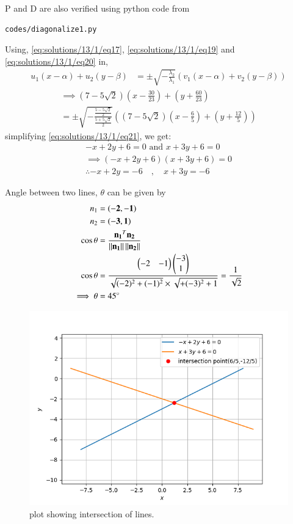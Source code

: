 P and D are also verified using python code from
\begin{lstlisting}
codes/diagonalize1.py
\end{lstlisting}
Using, \eqref{eq:solutions/13/1/eq17}, \eqref{eq:solutions/13/1/eq19} and \eqref{eq:solutions/13/1/eq20} in,
\begin{align}
	u_1(x-\alpha) + u_2(y-\beta) &= \pm \sqrt{-\frac{\lambda_2}{\lambda_1}}(v_1(x-\alpha) + v_2(y-\beta))\label{eq:solutions/13/1/eq14}
\end{align}
\begin{multline}\label{eq:solutions/13/1/eq21}
\implies	\left(7-5 \sqrt{2}\right)\left(x-\frac{30}{23}\right) + \left(y+\frac{60}{23}\right) \\= \pm \sqrt{-\frac{\frac{5-5\sqrt{2}}{2}}{\frac{5+5\sqrt{2}}{2}}}\left(\left(7-5 \sqrt{2}\right)\left(x-\frac{6}{5}\right) + \left(y+\frac{12}{5}\right)\right)
\end{multline}
simplifying \ref{eq:solutions/13/1/eq21}, we get:
\begin{align}
	\label{eq:solutions/13/1/eq22}-x + 2y + 6 = 0 \text{ and } x + 3y + 6 = 0\\
	\implies (-x + 2y + 6)(x + 3y + 6) = 0\\
	\therefore -x+2y=-6 \quad , \quad x+3y=-6\label{eq:solutions/13/1/eq23}
\end{align}


Angle between two lines, $\theta$ can be given by
\begin{align}
n_1&=(\mathbf{-2,-1})\\
n_2&=(\mathbf{-3,1})\\
\cos \theta &= \frac{\mathbf{n_1}^T\mathbf{n_2}}{\left\lVert\mathbf{n_1}\right\rVert\left\lVert\mathbf{n_2}\right\rVert}\\
\cos \theta&=\frac{\begin{pmatrix}-2&-1\end{pmatrix}\begin{pmatrix}-3\\1\end{pmatrix}}{\sqrt{(-2)^2 +(-1)^2} \times \sqrt{+(-3)^2+1}}=\frac{1}{\sqrt{2}}\\
\implies \theta &= 45\degree
\end{align}
\begin{figure}[!h]
\centering
\includegraphics[width=\columnwidth]{./solutions/13/1/Figure_1.png}
\caption{plot showing intersection of lines.}
\label{eq:solutions/13/1/Fig_1}
\end{figure}
